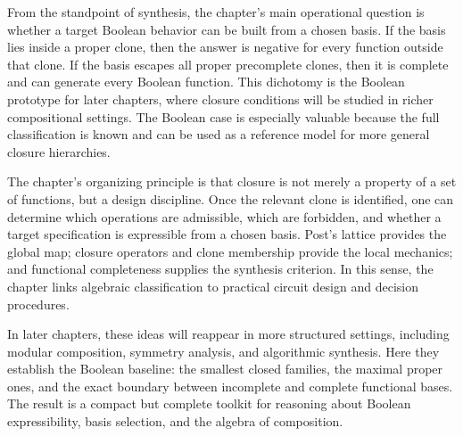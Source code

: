 \documentclass[11pt]{article}
\begin{document}
From the standpoint of synthesis, the chapter's main operational question is whether a target Boolean behavior can be built from a chosen basis. If the basis lies inside a proper clone, then the answer is negative for every function outside that clone. If the basis escapes all proper precomplete clones, then it is complete and can generate every Boolean function. This dichotomy is the Boolean prototype for later chapters, where closure conditions will be studied in richer compositional settings. The Boolean case is especially valuable because the full classification is known and can be used as a reference model for more general closure hierarchies.

The chapter's organizing principle is that closure is not merely a property of a set of functions, but a design discipline. Once the relevant clone is identified, one can determine which operations are admissible, which are forbidden, and whether a target specification is expressible from a chosen basis. Post's lattice provides the global map; closure operators and clone membership provide the local mechanics; and functional completeness supplies the synthesis criterion. In this sense, the chapter links algebraic classification to practical circuit design and decision procedures.

In later chapters, these ideas will reappear in more structured settings, including modular composition, symmetry analysis, and algorithmic synthesis. Here they establish the Boolean baseline: the smallest closed families, the maximal proper ones, and the exact boundary between incomplete and complete functional bases. The result is a compact but complete toolkit for reasoning about Boolean expressibility, basis selection, and the algebra of composition.
\end{document}
